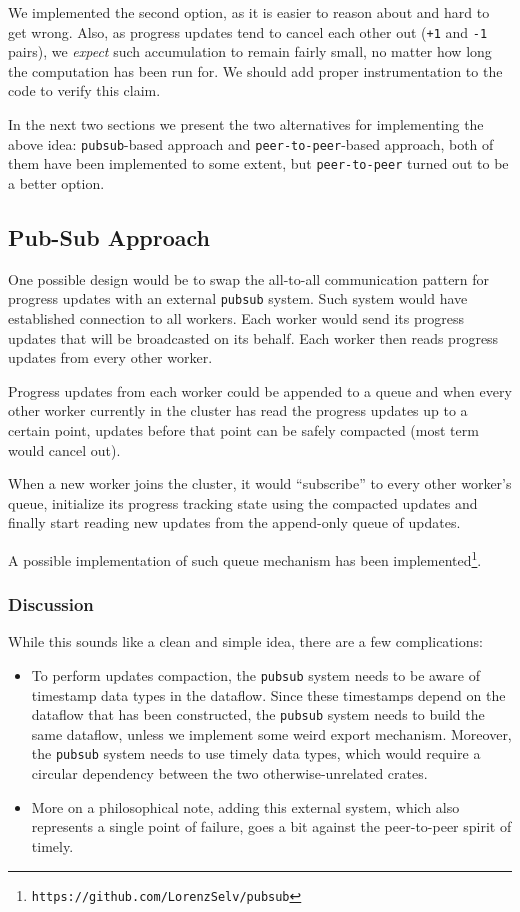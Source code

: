 \documentclass[12pt]{extarticle}
\begin{document}
We implemented the second option, as it is easier to reason about and hard to get wrong. Also,
as progress updates tend to cancel each other out (\verb|+1| and \verb|-1| pairs), we \textit{expect}
such accumulation to remain fairly small, no matter how long the computation has been run for.
We should add proper instrumentation to the code to verify this claim.

In the next two sections we present the two alternatives for implementing the above idea:
\verb|pubsub|-based approach and \verb|peer-to-peer|-based approach, both of them
have been implemented to some extent, but \verb|peer-to-peer| turned out to be a better option.

\subsection{Pub-Sub Approach}

One possible design would be to swap the all-to-all communication pattern for progress updates
with an external \verb|pubsub| system. Such system would have established connection to all workers.
Each worker would send its progress updates that will be broadcasted on its behalf. Each worker
then reads progress updates from every other worker.

Progress updates from each worker could be appended to a queue and when every other worker currently
in the cluster has read the progress updates up to a certain point, updates before that point
can be safely compacted (most term would cancel out).

When a new worker joins the cluster, it would ``subscribe'' to every other worker's queue,
initialize its progress tracking state using the compacted updates and finally start reading
new updates from the append-only queue of updates.

A possible implementation of such queue mechanism has been implemented\footnote{\verb|https://github.com/LorenzSelv/pubsub|}.

\subsubsection{Discussion}

While this sounds like a clean and simple idea, there are a few complications:
\begin{itemize}
    \item To perform updates compaction, the \verb|pubsub| system needs to be aware of timestamp
        data types in the dataflow. Since these timestamps depend on the dataflow that has been constructed,
        the \verb|pubsub| system needs to build the same dataflow, unless we implement some weird export
        mechanism. Moreover, the \verb|pubsub| system needs to use timely data types, which would require
        a circular dependency between the two otherwise-unrelated crates.

    \item More on a philosophical note, adding this external system, which also represents a single point of
        failure, goes a bit against the peer-to-peer spirit of timely.

\end{itemize}
\end{document}
